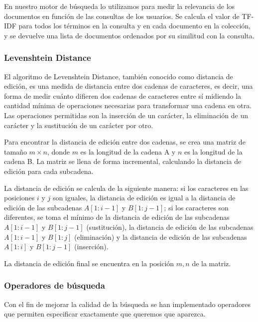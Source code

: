 \documentclass{article}
\begin{document}
En nuestro motor de búsqueda lo utilizamos para medir la relevancia de los documentos en función de las consultas de los usuarios. Se calcula el valor de TF-IDF para todos los términos en la consulta y en cada documento en la colección, y se devuelve una lista de documentos ordenados por su similitud con la consulta.

\subsubsection{Levenshtein Distance}

El algoritmo de Levenshtein Distance, también conocido como distancia de edición, es una medida de distancia entre dos cadenas de caracteres, es decir, una forma de medir cuánto difieren dos cadenas de caracteres entre sí midiendo la cantidad mínima de operaciones necesarias para transformar una cadena en otra. Las operaciones permitidas son la inserción de un carácter, la eliminación de un carácter y la sustitución de un carácter por otro.

Para encontrar la distancia de edición entre dos cadenas, se crea una matriz de tamaño $m \times n$, donde $m$ es la longitud de la cadena A y $n$ es la longitud de la cadena B. La matriz se llena de forma incremental, calculando la distancia de edición para cada subcadena.

La distancia de edición se calcula de la siguiente manera: si los caracteres en las posiciones $i$ y $j$ son iguales, la distancia de edición es igual a la distancia de edición de las subcadenas $A[1:i-1]$ y $B[1:j-1]$; si los caracteres son diferentes, se toma el mínimo de la distancia de edición de las subcadenas $A[1:i-1]$ y $B[1:j-1]$ (sustitución), la distancia de edición de las subcadenas $A[1:i-1]$ y $B[1:j]$ (eliminación) y la distancia de edición de las subcadenas $A[1:i]$ y $B[1:j-1]$ (inserción).

La distancia de edición final se encuentra en la posición $m,n$ de la matriz.

\subsubsection{Operadores de búsqueda}

Con el fin de mejorar la calidad de la búsqueda se han implementado operadores que permiten especificar exactamente que queremos que aparezca.
\end{document}
